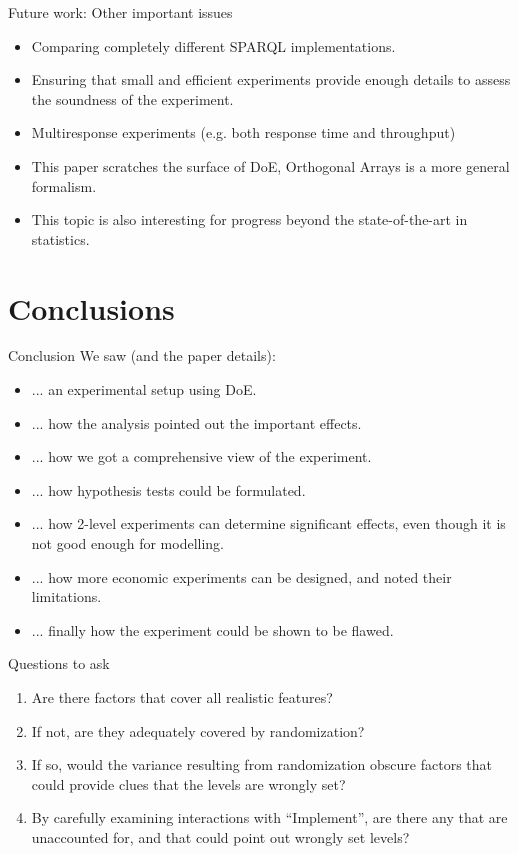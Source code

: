 \documentclass[english,usenames,dvipsnames,aspectratio=169]{beamer}
\begin{document}
\begin{frame}{Future work: Other important issues}

  \begin{itemize}
  \item Comparing completely different SPARQL implementations.
  \item Ensuring that small and efficient experiments provide enough
    details to assess the soundness of the experiment.
  \item Multiresponse experiments (e.g. both response time and throughput)
  \item This paper scratches the surface of DoE, Orthogonal Arrays is
    a more general formalism.
  \item This topic is also interesting for progress beyond the
    state-of-the-art in statistics.
  \end{itemize}
  
\end{frame}

\section{Conclusions}

\begin{frame}{Conclusion}
We saw (and the paper details):
  \begin{itemize}
  \item ... an experimental setup using DoE.
  \item ... how the analysis pointed out the important effects.
  \item ... how we got a comprehensive view of the experiment.
  \item ... how hypothesis tests could be formulated.
  \item ... how 2-level experiments can determine significant effects,
    even though it is not good enough for modelling.
  \item ... how more economic experiments can be designed, and noted
    their limitations.
  \item ... finally how the experiment could be shown to be flawed.
  \end{itemize}
\end{frame}

\begin{frame}{Questions to ask}

\begin{enumerate}
\item Are there factors that cover all realistic features?
\item If not, are they adequately covered by randomization?
\item If so, would the variance resulting from randomization obscure
  factors that could provide clues that the levels are wrongly set?
\item By carefully examining interactions with ``Implement'', are
  there any that are unaccounted for, and that could point out wrongly
  set levels?
\end{enumerate}

\end{frame}
\end{document}
